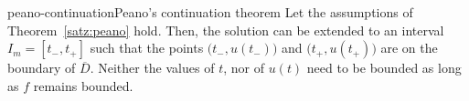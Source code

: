 \begin{Theorem*}{peano-continuation}{Peano's continuation theorem}
  Let the assumptions of Theorem~\ref{satz:peano} hold. Then, the
  solution can be extended to an interval $I_m = [t_-, t_+]$ such that
  the points $\bigl(t_-,u(t_-)\bigr)$ and $\bigl(t_+,u(t_+)\bigr)$ are
  on the boundary of $\overline D$. Neither the values of $t$, nor of
  $u(t)$ need to be bounded as long as $f$ remains bounded.
\end{Theorem*}